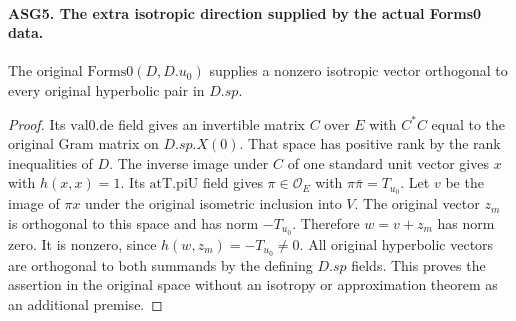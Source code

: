 \documentclass[11pt,a4paper]{article}
\numberwithin{equation}{section}
\theoremstyle{remark}\newtheorem{remark}[theorem]{Remark}
\begin{document}
\paragraph{ASG5. The extra isotropic direction supplied by the actual Forms0 data.}
\label{claim:ASG5}
The original \(\mathrm{Forms0}(D,D.u_0)\) supplies a nonzero
isotropic vector orthogonal to every original hyperbolic pair in \(D.sp\).
\begin{proof}
Its \(\mathrm{val0.de}\) field gives an invertible matrix
\(C\) over \(E\) with \(C^*C\) equal to the original Gram
matrix on \(D.sp.X(0)\).  That space has positive rank by the
rank inequalities of \(D\).  The inverse image under \(C\)
of one standard unit vector gives \(x\) with \(h(x,x)=1\).
Its \(\mathrm{atT.piU}\) field gives \(\pi\in\mathcal O_E\)
with \(\pi\bar\pi=T_{u_0}\).  Let \(v\) be the image of
\(\pi x\) under the original isometric inclusion into \(V\).
The original vector \(z_m\) is orthogonal to this space and has
norm \(-T_{u_0}\).  Therefore
\(w=v+z_m\) has norm zero.  It is nonzero, since
\(h(w,z_m)=-T_{u_0}\ne0\).  All original hyperbolic vectors
are orthogonal to both summands by the defining \(D.sp\) fields.
This proves the assertion in the original space without an isotropy
or approximation theorem as an additional premise.
\end{proof}

\end{document}
